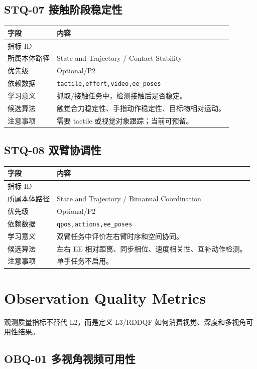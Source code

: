\documentclass[UTF8,zihao=-4]{ctexart}
\newcommand{\Code}[1]{\texttt{#1}}
\newcommand{\MID}[1]{\texttt{\seqsplit{#1}}}
\begin{document}
\subsection{STQ-07 接触阶段稳定性}

\begin{longtable}{L{3.6cm} L{9.6cm}}
\toprule
字段 & 内容 \\
\midrule
指标 ID & \MID{STQ-07} \\
所属本体路径 & State and Trajectory / Contact Stability \\
优先级 & Optional/P2 \\
依赖数据 & \Code{tactile,effort,video,ee\_poses} \\
学习意义 & 抓取/接触任务中，检测接触后是否稳定。 \\
候选算法 & 触觉合力稳定性、手指动作稳定性、目标物相对运动。 \\
注意事项 & 需要 tactile 或视觉对象跟踪；当前可预留。 \\
\bottomrule
\end{longtable}

\subsection{STQ-08 双臂协调性}

\begin{longtable}{L{3.6cm} L{9.6cm}}
\toprule
字段 & 内容 \\
\midrule
指标 ID & \MID{STQ-08} \\
所属本体路径 & State and Trajectory / Bimanual Coordination \\
优先级 & Optional/P2 \\
依赖数据 & \Code{qpos,actions,ee\_poses} \\
学习意义 & 双臂任务中评价左右臂时序和空间协同。 \\
候选算法 & 左右 EE 相对距离、同步相位、速度相关性、互补动作检测。 \\
注意事项 & 单手任务不启用。 \\
\bottomrule
\end{longtable}

\section{Observation Quality Metrics}

观测质量指标不替代 L2，而是定义 L3/RDDQF 如何消费视觉、深度和多视角可用性结果。


\subsection{OBQ-01 多视角视频可用性}
\end{document}
